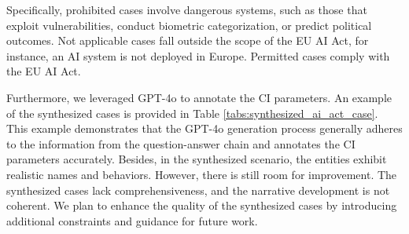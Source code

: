 Specifically, prohibited cases involve dangerous systems, such as those that exploit vulnerabilities, conduct biometric categorization, or predict political outcomes. Not applicable cases fall outside the scope of the EU AI Act, for instance, an AI system is not deployed in Europe. Permitted cases comply with the EU AI Act.

Furthermore, we leveraged GPT-4o to annotate the CI parameters. An example of the synthesized cases is provided in Table \ref{tabs:synthesized_ai_act_case}. This example demonstrates that the GPT-4o generation process generally adheres to the information from the question-answer chain and annotates the CI parameters accurately. Besides, in the synthesized scenario, the entities exhibit realistic names and behaviors. However, there is still room for improvement. The synthesized cases lack comprehensiveness, and the narrative development is not coherent. We plan to enhance the quality of the synthesized cases by introducing additional constraints and guidance for future work.




